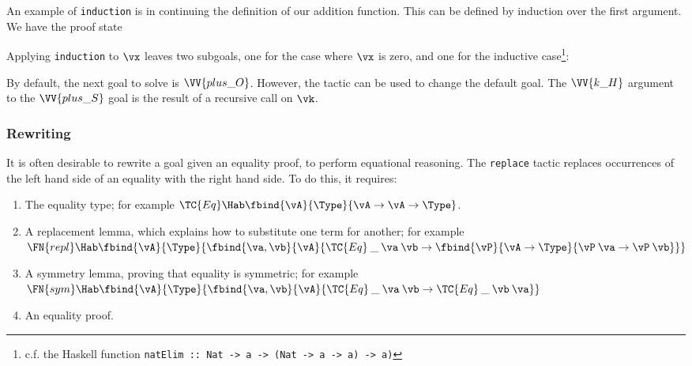 


An example of \texttt{induction} is in continuing the definition of
our addition function. This can be defined by induction over the first
argument. We have the proof state


Applying \texttt{induction} to $\vx$ leaves two subgoals, one for the
case where $\vx$ is zero, and one for the inductive
case\footnote{c.f. the Haskell function \texttt{natElim
    :: Nat -> a -> (Nat -> a -> a) -> a)}}:


By default, the next goal to solve is $\VV{plus\_O}$. However, the
 tactic can be used to change the default goal.
The $\VV{k\_H}$ argument to the $\VV{plus\_S}$ goal is the result of a
recursive call on $\vk$.

\subsubsection{Rewriting}
It is often desirable to rewrite a goal given an equality proof, to
perform equational reasoning. The \texttt{replace} tactic replaces
occurrences of the left hand side of an equality with the right hand
side. To do this, it requires:

\begin{enumerate}
\item The equality type; for example
  $\TC{Eq}\Hab\fbind{\vA}{\Type}{\vA\to\vA\to\Type}$.
\item A replacement lemma, which explains how to substitute one term
  for another; for example\\
  $\FN{repl}\Hab\fbind{\vA}{\Type}{
    \fbind{\va,\vb}{\vA}{
	\TC{Eq}\:\_\:\va\:\vb\to\fbind{\vP}{\vA\to\Type}{
	  \vP\:\va\to\vP\:\vb}}}$
\item A symmetry lemma, proving that equality is symmetric; for
  example\\
  $\FN{sym}\Hab\fbind{\vA}{\Type}{
      \fbind{\va,\vb}{\vA}{\TC{Eq}\:\_\:\va\:\vb\to\TC{Eq}\:\_\:\vb\:\va}}$
\item An equality proof.
\end{enumerate}


